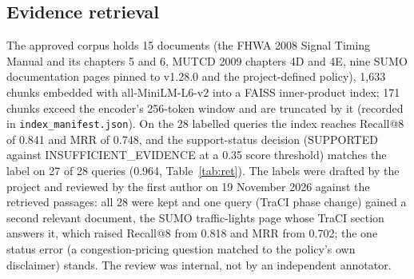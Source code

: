 \subsection{Evidence retrieval}
The approved corpus holds 15 documents (the FHWA 2008 Signal Timing Manual and its chapters 5 and 6, MUTCD 2009
chapters 4D and 4E, nine SUMO documentation pages pinned to v1.28.0 and the project-defined policy), 1{,}633 chunks
embedded with all-MiniLM-L6-v2 into a FAISS inner-product index; 171 chunks exceed the encoder's 256-token window and
are truncated by it (recorded in \texttt{index\_manifest.json}). On the 28 labelled queries the index reaches
Recall@8 of 0.841 and MRR of 0.748, and the support-status decision (SUPPORTED against INSUFFICIENT\_EVIDENCE at a
0.35 score threshold) matches the label on 27 of 28 queries (0.964, Table~\ref{tab:ret}). The labels were drafted by
the project and reviewed by the first author on 19 November 2026 against the retrieved passages: all 28 were kept and
one query (TraCI phase change) gained a second relevant document, the SUMO traffic-lights page whose TraCI section
answers it, which raised Recall@8 from 0.818 and MRR from 0.702; the one status error (a congestion-pricing question
matched to the policy's own disclaimer) stands. The review was internal, not by an independent annotator.

